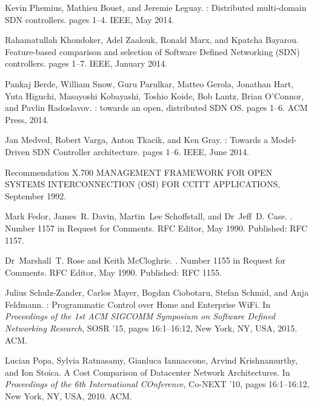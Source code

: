 \begin{thebibliography}{10}
Kevin Phemius, Mathieu Bouet, and Jeremie Leguay.
: {Distributed} multi-domain {SDN} controllers.
\newblock pages 1--4. IEEE, May 2014.

Rahamatullah Khondoker, Adel Zaalouk, Ronald Marx, and Kpatcha Bayarou.
\newblock Feature-based comparison and selection of {Software} {Defined}
  {Networking} ({SDN}) controllers.
\newblock pages 1--7. IEEE, January 2014.

Pankaj Berde, William Snow, Guru Parulkar, Matteo Gerola, Jonathan Hart, Yuta
  Higuchi, Masayoshi Kobayashi, Toshio Koide, Bob Lantz, Brian O'Connor, and
  Pavlin Radoslavov.
: towards an open, distributed {SDN} {OS}.
\newblock pages 1--6. ACM Press, 2014.

Jan Medved, Robert Varga, Anton Tkacik, and Ken Gray.
: {Towards} a {Model}-{Driven} {SDN} {Controller}
  architecture.
\newblock pages 1--6. IEEE, June 2014.

Recommendation {X}.700 {MANAGEMENT} {FRAMEWORK} {FOR} {OPEN} {SYSTEMS}
  {INTERCONNECTION} ({OSI}) {FOR} {CCITT} {APPLICATIONS}, September 1992.

Mark Fedor, James~R. Davin, Martin~Lee Schoffstall, and Dr~Jeff~D. Case.
.
\newblock Number 1157 in Request for {Comments}. RFC Editor, May 1990.
\newblock Published: RFC 1157.

Dr~Marshall~T. Rose and Keith McCloghrie.
.
\newblock Number 1155 in Request for {Comments}. RFC Editor, May 1990.
\newblock Published: RFC 1155.

Julius Schulz-Zander, Carlos Mayer, Bogdan Ciobotaru, Stefan Schmid, and Anja
  Feldmann.
: {Programmatic} {Control} over {Home} and {Enterprise}
  {WiFi}.
\newblock In {\em Proceedings of the 1st {ACM} {SIGCOMM} {Symposium} on
  {Software} {Defined} {Networking} {Research}}, {SOSR} '15, pages 16:1--16:12,
  New York, NY, USA, 2015. ACM.

Lucian Popa, Sylvia Ratnasamy, Gianluca Iannaccone, Arvind Krishnamurthy, and
  Ion Stoica.
\newblock A {Cost} {Comparison} of {Datacenter} {Network} {Architectures}.
\newblock In {\em Proceedings of the 6th {International} {COnference}},
  Co-{NEXT} '10, pages 16:1--16:12, New York, NY, USA, 2010. ACM.


\end{thebibliography}

